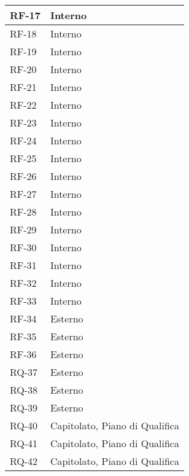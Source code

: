 \begin{longtable}{|>{\centering\arraybackslash}m{}|>{\centering\arraybackslash}m{}|}
	RF-17              & Interno                        \\\hline
	RF-18              & Interno                        \\\hline
	RF-19              & Interno                        \\\hline
	RF-20              & Interno                        \\\hline
	RF-21              & Interno                        \\\hline
	RF-22              & Interno                        \\\hline
	RF-23              & Interno                        \\\hline
	RF-24              & Interno                        \\\hline
	RF-25              & Interno                        \\\hline
	RF-26              & Interno                        \\\hline
	RF-27              & Interno                        \\\hline
	RF-28              & Interno                        \\\hline
	RF-29              & Interno                        \\\hline
	RF-30              & Interno                        \\\hline
	RF-31              & Interno                        \\\hline
	RF-32              & Interno                        \\\hline
	RF-33              & Interno                        \\\hline
	RF-34              & Esterno                        \\\hline
	RF-35              & Esterno                        \\\hline
	RF-36              & Esterno                        \\\hline
	RQ-37              & Esterno                        \\\hline
	RQ-38              & Esterno                        \\\hline
	RQ-39              & Esterno                        \\\hline
	RQ-40              & Capitolato, Piano di Qualifica \\\hline
	RQ-41              & Capitolato, Piano di Qualifica \\\hline
	RQ-42              & Capitolato, Piano di Qualifica \\\hline

\end{longtable}
